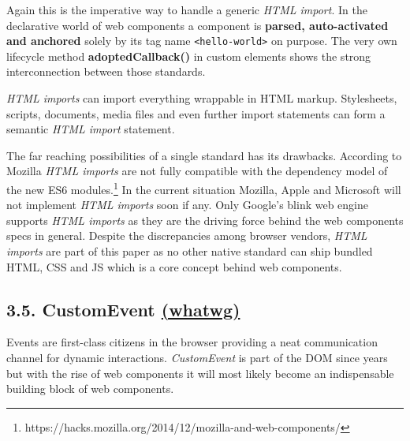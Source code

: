 \documentclass[]{article}
\begin{document}
Again this is the imperative way to handle a generic \emph{HTML import}.
In the declarative world of web components a component is
\textbf{parsed, auto-activated and anchored} solely by its tag name
\texttt{\textless{}hello-world\textgreater{}} on purpose. The very own
lifecycle method \textbf{adoptedCallback()} in custom elements shows the
strong interconnection between those standards.

\emph{HTML imports} can import everything wrappable in HTML markup.
Stylesheets, scripts, documents, media files and even further import
statements can form a semantic \emph{HTML import} statement.

The far reaching possibilities of a single standard has its drawbacks.
According to Mozilla \emph{HTML imports} are not fully compatible with
the dependency model of the new ES6 modules.\footnote{https://hacks.mozilla.org/2014/12/mozilla-and-web-components/}
In the current situation Mozilla, Apple and Microsoft will not implement
\emph{HTML imports} soon if any. Only Google's blink web engine supports
\emph{HTML imports} as they are the driving force behind the web
components specs in general. Despite the discrepancies among browser
vendors, \emph{HTML imports} are part of this paper as no other native
standard can ship bundled HTML, CSS and JS which is a core concept
behind web components.

\subsection{\texorpdfstring{3.5. CustomEvent
\href{https://dom.spec.whatwg.org/\#interface-customevent}{(whatwg)}}{3.5. CustomEvent (whatwg)}}\label{customevent-whatwg}

Events are first-class citizens in the browser providing a neat
communication channel for dynamic interactions. \emph{CustomEvent} is
part of the DOM since years but with the rise of web components it will
most likely become an indispensable building block of web components.
\end{document}
